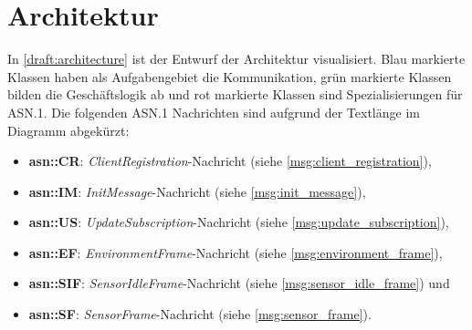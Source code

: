 

\section{Architektur}
		
In \autoref{draft:architecture} ist der Entwurf der Architektur visualisiert.
Blau markierte Klassen haben als Aufgabengebiet die Kommunikation, grün markierte Klassen bilden die Geschäftslogik ab und rot markierte Klassen sind Spezialisierungen für ASN.1.
Die folgenden ASN.1 Nachrichten sind aufgrund der Textlänge im Diagramm abgekürzt:
\begin{itemize}
	\item \textbf{asn::CR}: \textit{ClientRegistration}-Nachricht (siehe \autoref{msg:client_registration}),
	\item \textbf{asn::IM}: \textit{InitMessage}-Nachricht (siehe \autoref{msg:init_message}),
	\item \textbf{asn::US}: \textit{UpdateSubscription}-Nachricht (siehe \autoref{msg:update_subscription}),
	\item \textbf{asn::EF}: \textit{EnvironmentFrame}-Nachricht (siehe \autoref{msg:environment_frame}),
	\item \textbf{asn::SIF}: \textit{SensorIdleFrame}-Nachricht (siehe \autoref{msg:sensor_idle_frame}) und
	\item \textbf{asn::SF}: \textit{SensorFrame}-Nachricht (siehe \autoref{msg:sensor_frame}).
\end{itemize}


